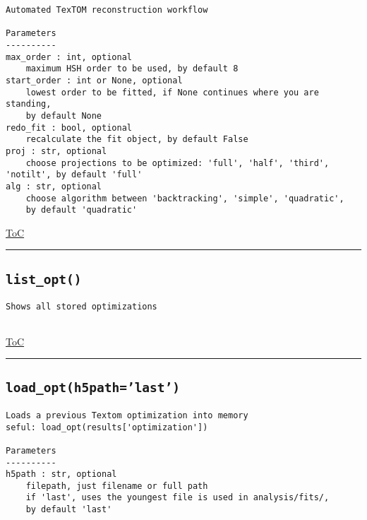 \documentclass{article}
\begin{document}
\begin{lstlisting}[language=docstring]
Automated TexTOM reconstruction workflow

Parameters
----------
max_order : int, optional
    maximum HSH order to be used, by default 8    
start_order : int or None, optional
    lowest order to be fitted, if None continues where you are standing, 
    by default None
redo_fit : bool, optional
    recalculate the fit object, by default False
proj : str, optional
    choose projections to be optimized: 'full', 'half', 'third', 'notilt', by default 'full'
alg : str, optional
    choose algorithm between 'backtracking', 'simple', 'quadratic', 
    by default 'quadratic'
\end{lstlisting}

\begin{flushright}

\hyperref[toc]{ToC}

\end{flushright}



\vspace{5mm}

\hrule

\subsection*{\texttt{list\_opt()}}

\begin{lstlisting}[language=docstring]
Shows all stored optimizations
    
\end{lstlisting}

\begin{flushright}

\hyperref[toc]{ToC}

\end{flushright}



\vspace{5mm}

\hrule

\subsection*{\texttt{load\_opt(h5path='last')}}

\begin{lstlisting}[language=docstring]
Loads a previous Textom optimization into memory
seful: load_opt(results['optimization'])

Parameters
----------
h5path : str, optional
    filepath, just filename or full path
    if 'last', uses the youngest file is used in analysis/fits/, 
    by default 'last'
\end{lstlisting}
\end{document}
